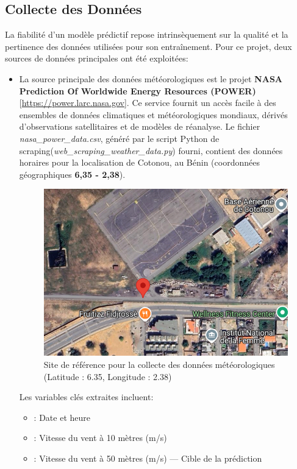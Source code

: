 \documentclass[12pt]{article}
\begin{document}
\subsection{Collecte des Données}
La fiabilité d'un modèle prédictif repose intrinsèquement sur la qualité et la pertinence des données utilisées pour son entraînement. Pour ce projet, deux sources de données principales ont été exploitées:
\begin{itemize}[label=$\color{blue}\clubsuit$]
	\item \textbf{\color{blue}{Données Météorologiques NASA POWER:}} La source principale des données météorologiques est le projet \textbf{NASA Prediction Of Worldwide Energy Resources (POWER)} [\href{https://power.larc.nasa.gov}{\color{blue}https://power.larc.nasa.gov}]. Ce service fournit un accès facile à des ensembles de données climatiques et météorologiques mondiaux, dérivés d'observations satellitaires et de modèles de réanalyse. Le fichier \textit{nasa\_power\_data.csv}, généré par le script Python de scraping(\textit{web\_scraping\_weather\_data.py}) fourni, contient des données horaires pour la localisation de Cotonou, au Bénin (coordonnées géographiques \textbf{6,35 - 2,38}).
	\begin{figure}[H]
		\centering
		\includegraphics[width=0.7\linewidth]{../graphique/lieu}
		\caption{Site de référence pour la collecte des données météorologiques (Latitude : 6.35, Longitude : 2.38)}
		\label{fig:lieu}
	\end{figure}
	 Les variables clés extraites incluent:
	\begin{itemize}[label=$\circ$]
		\item \textbf{\color{brown}{timestamp}}:  Date et heure
		\item \textbf{\color{brown}{wind\_speed\_10m }}: Vitesse du vent à 10 mètres (m/s)
		\item \textbf{\color{brown}{wind\_speed\_50m }}: Vitesse du vent à 50 mètres (m/s) — Cible de la prédiction

\end{itemize}
\end{itemize}
\end{document}
